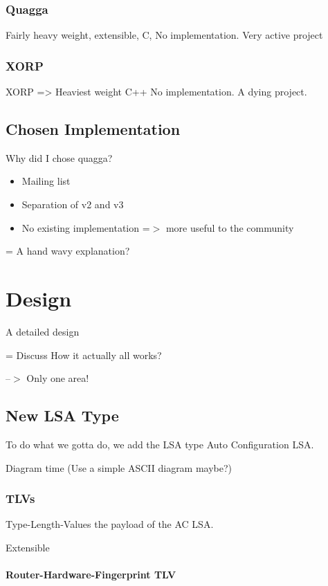\documentclass[12pt]{report}
\begin{document}
\subsection{Quagga}
Fairly heavy weight, extensible, C, No implementation. Very active project

\subsection{XORP}
XORP => Heaviest weight C++ No implementation. A dying project.

\section{Chosen Implementation}
Why did I chose quagga?

\begin{itemize}
\item Mailing list
\item Separation of v2 and v3
\item No existing implementation =$>$ more useful to the community
\end{itemize}

= A hand wavy explanation?

\chapter{Design}
A detailed design

= Discuss How it actually all works?

--$>$ Only one area!

\section{New LSA Type}
To do what we gotta do, we add the LSA type Auto Configuration LSA. 

Diagram time (Use a simple ASCII diagram maybe?)

\subsection{TLVs}

Type-Length-Values the payload of the AC LSA. 

Extensible

\subsubsection{Router-Hardware-Fingerprint TLV}
\end{document}
